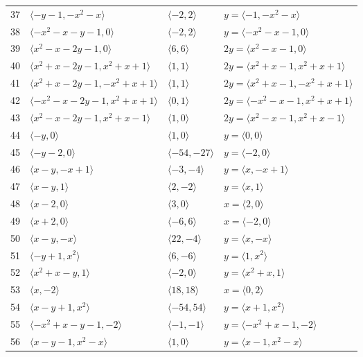 \documentclass[11pt]{article}
\begin{document}
\begin{longtable}{@{}rlll@{}}
37 & $\langle -y-1,-x^{2}-x\rangle$ & $\langle -2,2\rangle$ & $y=\langle -1,-x^{2}-x\rangle$\\
38 & $\langle -x^{2}-x-y-1,0\rangle$ & $\langle -2,2\rangle$ & $y=\langle -x^{2}-x-1,0\rangle$\\
39 & $\langle x^{2}-x-2y-1,0\rangle$ & $\langle 6,6\rangle$ & $2y=\langle x^{2}-x-1,0\rangle$\\
40 & $\langle x^{2}+x-2y-1,x^{2}+x+1\rangle$ & $\langle 1,1\rangle$ & $2y=\langle x^{2}+x-1,x^{2}+x+1\rangle$\\
41 & $\langle x^{2}+x-2y-1,-x^{2}+x+1\rangle$ & $\langle 1,1\rangle$ & $2y=\langle x^{2}+x-1,-x^{2}+x+1\rangle$\\
42 & $\langle -x^{2}-x-2y-1,x^{2}+x+1\rangle$ & $\langle 0,1\rangle$ & $2y=\langle -x^{2}-x-1,x^{2}+x+1\rangle$\\
43 & $\langle x^{2}-x-2y-1,x^{2}+x-1\rangle$ & $\langle 1,0\rangle$ & $2y=\langle x^{2}-x-1,x^{2}+x-1\rangle$\\
44 & $\langle -y,0\rangle$ & $\langle 1,0\rangle$ & $y=\langle 0,0\rangle$\\
45 & $\langle -y-2,0\rangle$ & $\langle -54,-27\rangle$ & $y=\langle -2,0\rangle$\\
46 & $\langle x-y,-x+1\rangle$ & $\langle -3,-4\rangle$ & $y=\langle x,-x+1\rangle$\\
47 & $\langle x-y,1\rangle$ & $\langle 2,-2\rangle$ & $y=\langle x,1\rangle$\\
48 & $\langle x-2,0\rangle$ & $\langle 3,0\rangle$ & $x=\langle 2,0\rangle$\\
49 & $\langle x+2,0\rangle$ & $\langle -6,6\rangle$ & $x=\langle -2,0\rangle$\\
50 & $\langle x-y,-x\rangle$ & $\langle 22,-4\rangle$ & $y=\langle x,-x\rangle$\\
51 & $\langle -y+1,x^{2}\rangle$ & $\langle 6,-6\rangle$ & $y=\langle 1,x^{2}\rangle$\\
52 & $\langle x^{2}+x-y,1\rangle$ & $\langle -2,0\rangle$ & $y=\langle x^{2}+x,1\rangle$\\
53 & $\langle x,-2\rangle$ & $\langle 18,18\rangle$ & $x=\langle 0,2\rangle$\\
54 & $\langle x-y+1,x^{2}\rangle$ & $\langle -54,54\rangle$ & $y=\langle x+1,x^{2}\rangle$\\
55 & $\langle -x^{2}+x-y-1,-2\rangle$ & $\langle -1,-1\rangle$ & $y=\langle -x^{2}+x-1,-2\rangle$\\
56 & $\langle x-y-1,x^{2}-x\rangle$ & $\langle 1,0\rangle$ & $y=\langle x-1,x^{2}-x\rangle$\\

\end{longtable}
\end{document}
